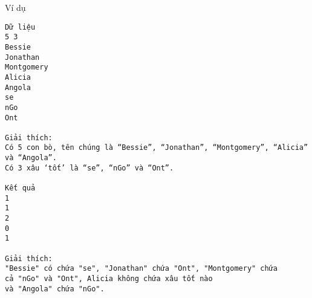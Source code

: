 Ví dụ
\begin{verbatim}
Dữ liệu
5 3
Bessie
Jonathan
Montgomery
Alicia
Angola
se
nGo
Ont

Giải thích:
Có 5 con bò, tên chúng là “Bessie”, “Jonathan”, “Montgomery”, “Alicia” và “Angola”.
Có 3 xâu ‘tốt’ là “se”, “nGo” và “Ont”.

Kết quả
1
1
2
0
1

Giải thích:
"Bessie" có chứa "se", "Jonathan" chứa "Ont", "Montgomery" chứa 
cả "nGo" và "Ont", Alicia không chứa xâu tốt nào 
và "Angola" chứa "nGo".
\end{verbatim}